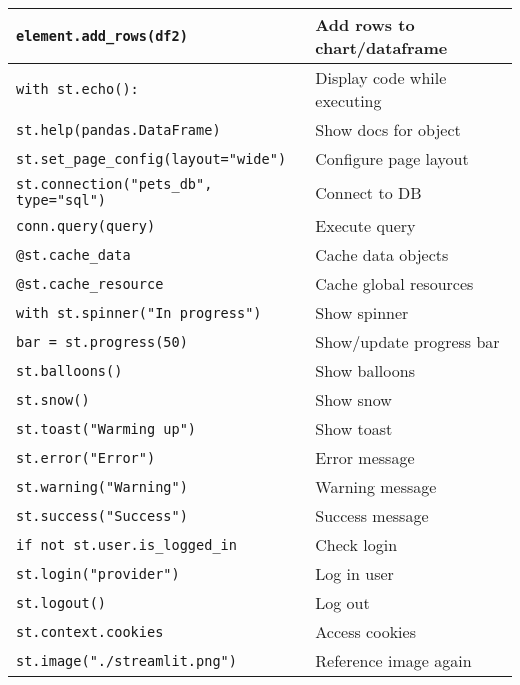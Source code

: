 \documentclass[11pt,a4paper]{article}
\begin{document}
\begin{longtable}{|L{8cm}|L{8cm}|}
\verb|element.add_rows(df2)| & Add rows to chart/dataframe \\ \hline
\verb|with st.echo():| & Display code while executing \\ \hline
\verb|st.help(pandas.DataFrame)| & Show docs for object \\ \hline
\verb|st.set_page_config(layout="wide")| & Configure page layout \\ \hline
\verb|st.connection("pets_db", type="sql")| & Connect to DB \\ \hline
\verb|conn.query(query)| & Execute query \\ \hline
\verb|@st.cache_data| & Cache data objects \\ \hline
\verb|@st.cache_resource| & Cache global resources \\ \hline
\verb|with st.spinner("In progress")| & Show spinner \\ \hline
\verb|bar = st.progress(50)| & Show/update progress bar \\ \hline
\verb|st.balloons()| & Show balloons \\ \hline
\verb|st.snow()| & Show snow \\ \hline
\verb|st.toast("Warming up")| & Show toast \\ \hline
\verb|st.error("Error")| & Error message \\ \hline
\verb|st.warning("Warning")| & Warning message \\ \hline
\verb|st.success("Success")| & Success message \\ \hline
\verb|if not st.user.is_logged_in| & Check login \\ \hline
\verb|st.login("provider")| & Log in user \\ \hline
\verb|st.logout()| & Log out \\ \hline
\verb|st.context.cookies| & Access cookies \\ \hline
\verb|st.image("./streamlit.png")| & Reference image again \\ \hline
\end{longtable}
\end{document}
